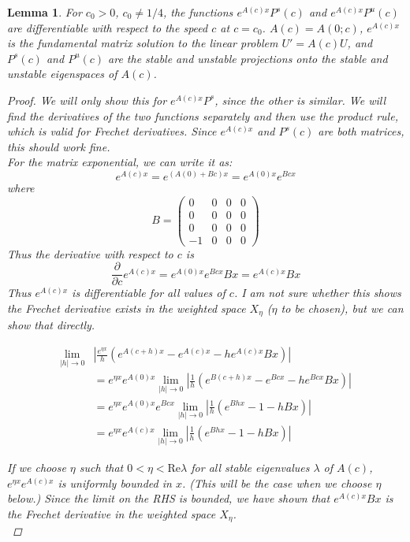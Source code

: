 \documentclass[12pt]{article}
\newtheorem{lemma}{Lemma}
\begin{document}
\begin{lemma}\label{derivatives}
For $c_0 > 0$, $c_0 \neq 1/4$, the functions $e^{A(c)x}P^s(c)$ and $e^{A(c)x}P^u(c)$ are differentiable with respect to the speed $c$ at $c = c_0$. $A(c) = A(0; c)$, $e^{A(c)x}$ is the fundamental matrix solution to the linear problem $U' = A(c) U$, and $P^s(c)$ and $P^u(c)$ are the stable and unstable projections onto the stable and unstable eigenspaces of $A(c)$. 
\begin{proof}
We will only show this for $e^{A(c)x}P^s$, since the other is similar. We will find the derivatives of the two functions separately and then use the product rule, which is valid for Frechet derivatives. Since $e^{A(c)x}$ and $P^s(c)$ are both matrices, this should work fine.\\

For the matrix exponential, we can write it as:
\[
e^{A(c)x} = e^{(A(0) + Bc)x} = e^{A(0)x}e^{Bcx}
\]
where 
\[
B = \begin{pmatrix}0&0&0&0\\0&0&0&0\\0&0&0&0\\-1&0&0&0\end{pmatrix}
\]
Thus the derivative with respect to $c$ is
\[
\frac{\partial}{\partial c} e^{A(c)x} = e^{A(0)x}e^{Bcx}Bx = e^{A(c)x} Bx
\]
Thus $e^{A(c)x}$ is differentiable for all values of $c$. I am not sure whether this shows the Frechet derivative exists in the weighted space $X_\eta$ ($\eta$ to be chosen), but we can show that directly.

\begin{align*}
\lim_{|h| \rightarrow 0} &\left| \frac{e^{\eta x}}{h} \left( e^{A(c+h)x} - e^{A(c)x} - h e^{A(c)x} Bx  \right) \right|  \\
&= e^{\eta x} e^{A(0)x}\lim_{|h| \rightarrow 0} \left| \frac{1}{h} \left( e^{B(c+h)x} - e^{Bcx} - h e^{Bcx} Bx  \right) \right| \\
&= e^{\eta x} e^{A(0)x}e^{Bcx}\lim_{|h| \rightarrow 0} \left| \frac{1}{h} \left( e^{Bhx} - 1 - h Bx  \right) \right| \\ 
&= e^{\eta x} e^{A(c)x} \lim_{|h| \rightarrow 0} \left| \frac{1}{h} \left( e^{Bhx} - 1 - h Bx  \right) \right| 
\end{align*}

If we choose $\eta$ such that $0 < \eta < \text{Re} \lambda$ for all stable eigenvalues $\lambda$ of $A(c)$, $e^{\eta x} e^{A(c)x}$ is uniformly bounded in $x$. (This will be the case when we choose $\eta$ below.) Since the limit on the RHS is bounded, we have shown that $e^{A(c)x} Bx$ is the Frechet derivative in the weighted space $X_\eta$.\\


\end{proof}
\end{lemma}
\end{document}

